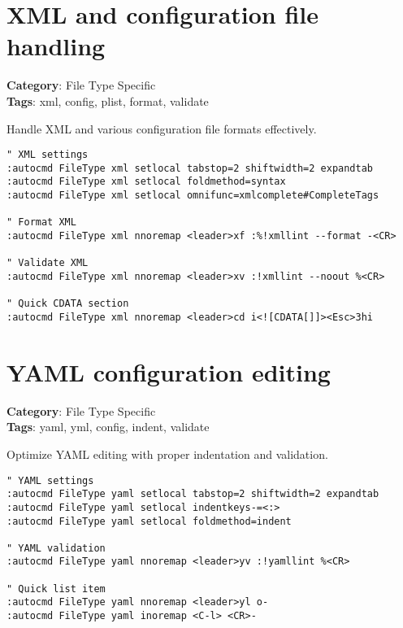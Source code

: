 {{{{{{\section{XML and configuration file handling}

\textbf{Category}: File Type Specific\\ \textbf{Tags}: xml, config, plist, format, validate
\vspace{0.5cm}

Handle XML and various configuration file formats effectively.

\begin{Exa*}{}
\begin{Verbatim}[fontsize=\footnotesize, breaklines, breakanywhere]
" XML settings
:autocmd FileType xml setlocal tabstop=2 shiftwidth=2 expandtab
:autocmd FileType xml setlocal foldmethod=syntax
:autocmd FileType xml setlocal omnifunc=xmlcomplete#CompleteTags

" Format XML
:autocmd FileType xml nnoremap <leader>xf :%!xmllint --format -<CR>

" Validate XML
:autocmd FileType xml nnoremap <leader>xv :!xmllint --noout %<CR>

" Quick CDATA section
:autocmd FileType xml nnoremap <leader>cd i<![CDATA[]]><Esc>3hi
\end{Verbatim}
\end{Exa*}

\section{YAML configuration editing}

\textbf{Category}: File Type Specific\\ \textbf{Tags}: yaml, yml, config, indent, validate
\vspace{0.5cm}

Optimize YAML editing with proper indentation and validation.

\begin{Exa*}{}
\begin{Verbatim}[fontsize=\footnotesize, breaklines, breakanywhere]
" YAML settings
:autocmd FileType yaml setlocal tabstop=2 shiftwidth=2 expandtab
:autocmd FileType yaml setlocal indentkeys-=<:>
:autocmd FileType yaml setlocal foldmethod=indent

" YAML validation
:autocmd FileType yaml nnoremap <leader>yv :!yamllint %<CR>

" Quick list item
:autocmd FileType yaml nnoremap <leader>yl o- 
:autocmd FileType yaml inoremap <C-l> <CR>- 
\end{Verbatim}
\end{Exa*}

}}}}}}
